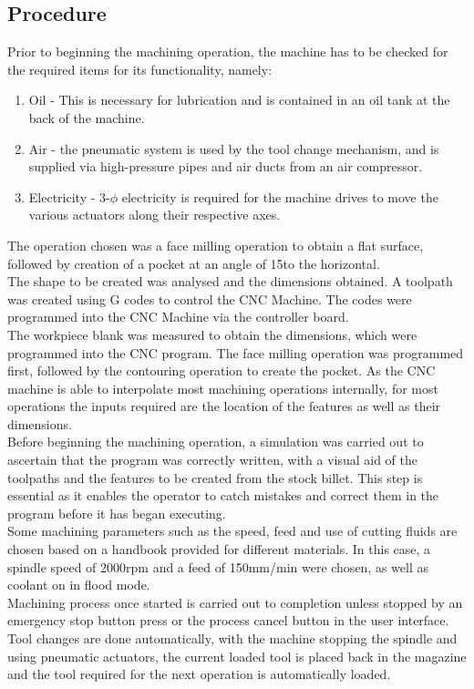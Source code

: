 \subsection{Procedure}
Prior to beginning the machining operation, the machine has to be checked for the required items for its functionality, namely:
\begin{enumerate}
	\item Oil - This is necessary for lubrication and is contained in an oil tank at the back of the machine.
	\item Air - the pneumatic system is used by the tool change mechanism, and is supplied via high-pressure pipes and air ducts from an air compressor.
	\item Electricity - 3-$\phi$ electricity is required for the machine drives to move the various actuators along their respective axes.
\end{enumerate}
The operation chosen was a face milling operation to obtain a flat surface, followed by creation of a pocket at an angle of 15\textdegree \space to the horizontal.\\
The shape to be created was analysed and the dimensions obtained. A toolpath was created using G codes to control the CNC Machine. The codes were programmed into the CNC Machine via the controller board.\\
The workpiece blank was measured to obtain the dimensions, which were programmed into the CNC program. The face milling operation was programmed first, followed by the contouring operation to create the pocket. As the CNC machine is able to interpolate most machining operations internally, for most operations the inputs required are the location of the features as well as their dimensions.\\
Before beginning the machining operation, a simulation was carried out to ascertain that the program was correctly written, with a visual aid of the toolpaths and the features to be created from the stock billet. This step is essential as it enables the operator to catch mistakes and correct them in the program before it has began executing.\\
Some machining parameters such as the speed, feed and use of cutting fluids are chosen based on a handbook provided for different materials. In this case, a spindle speed of 2000rpm and a feed of 150mm/min were chosen, as well as coolant on in flood mode.\\
Machining process once started is carried out to completion unless stopped by an emergency stop button press or the process cancel button in the user interface. Tool changes are done automatically, with the machine stopping the spindle and using pneumatic actuators, the current loaded tool is placed back in the magazine and the tool required for the next operation is automatically loaded.\\
